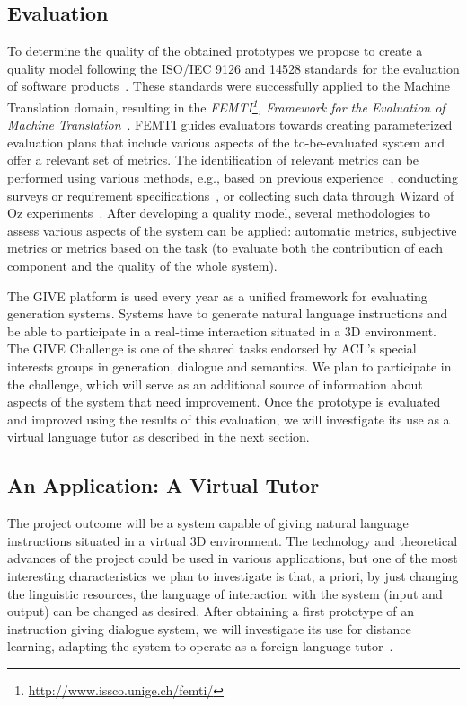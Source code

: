 \subsection{Evaluation}
To determine the quality of the obtained prototypes we propose to create a
quality model following the ISO/IEC
9126 and 14528 standards for the evaluation of software
products~\cite{ISO9126-1,ISO14598-1}. These standards were successfully applied
to
the Machine Translation domain, resulting in the
\emph{FEMTI\footnote{\url{http://www.issco.unige.ch/femti/}}, Framework for the
Evaluation of
Machine Translation}~\cite{Est2005}. FEMTI
guides evaluators towards creating parameterized evaluation
plans that include various aspects of the to-be-evaluated system and offer a
relevant set of metrics. The identification of relevant metrics can be performed
using various methods, e.g., based on previous
experience~\cite{paradise06,Litman2002}, conducting
surveys or requirement specifications~\cite{Lecoeuche98}, or
collecting such data through Wizard of Oz
experiments~\cite{Dahlback93}.
After developing a quality model, several methodologies to assess
various aspects of the system can be applied: automatic metrics,
subjective metrics or metrics based on the task (to
evaluate both the contribution of each component and the quality of the whole
system). 

The GIVE platform is used every year as a unified framework for evaluating
generation systems. Systems have to generate natural language
instructions and be able to participate in a real-time interaction situated in a
3D environment. The GIVE Challenge is one of the shared tasks endorsed by
ACL's special interests groups in generation, dialogue and semantics. We plan
to participate in the challenge, which will serve as an additional
source of information about aspects of the system that need
improvement.
Once the prototype is evaluated and improved using the results
of this evaluation, we will investigate its use as a virtual language tutor as
described in the next section.

\subsection{An Application: A Virtual Tutor}\label{applications}

The project outcome will be a system capable of giving natural language
instructions situated in a virtual 3D environment. The technology and
theoretical advances of the project could be used in various applications, but
one of the most interesting characteristics we plan to investigate is that, 
a priori, by just changing the linguistic resources, the language of interaction
with the system (input and output) can be changed as desired. After obtaining a
first prototype of an instruction giving dialogue system, 
 we will investigate its use for distance learning,
adapting the system to operate as a foreign language tutor~\cite{Wik09}.

